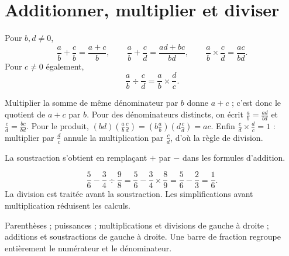 \documentclass[../cours_3e.tex]{subfiles}
\begin{document}
\section{Additionner, multiplier et diviser}
\begin{propriete}
Pour $b,d\ne0$,
\[\frac ab+\frac cb=\frac{a+c}{b},\qquad
\frac ab+\frac cd=\frac{ad+bc}{bd},\qquad
\frac ab\times\frac cd=\frac{ac}{bd}.\]
Pour $c\ne0$ également,
\[\frac ab\div\frac cd=\frac ab\times\frac dc.\]
\end{propriete}
\begin{demonstration}
Multiplier la somme de même dénominateur par $b$ donne $a+c$ ; c'est donc le quotient de $a+c$ par $b$. Pour des dénominateurs distincts, on écrit $\frac ab=\frac{ad}{bd}$ et $\frac cd=\frac{bc}{bd}$. Pour le produit, $(bd)(\frac ab\frac cd)=(b\frac ab)(d\frac cd)=ac$. Enfin $\frac cd\times\frac dc=1$ : multiplier par $\frac dc$ annule la multiplication par $\frac cd$, d'où la règle de division.
\end{demonstration}
La soustraction s'obtient en remplaçant $+$ par $-$ dans les formules d'addition.
\begin{exemple}
\[\frac56-\frac34\div\frac98
=\frac56-\frac34\times\frac89
=\frac56-\frac23=\frac16.\]
La division est traitée avant la soustraction. Les simplifications avant multiplication réduisent les calculs.
\end{exemple}
\begin{methode}[Priorités]
Parenthèses ; puissances ; multiplications et divisions de gauche à droite ; additions et soustractions de gauche à droite. Une barre de fraction regroupe entièrement le numérateur et le dénominateur.
\end{methode}
\end{document}
